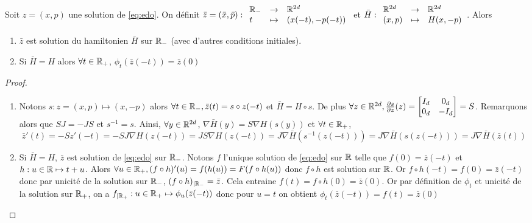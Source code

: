 \documentclass[10pt,a4paper]{article}
\begin{document}
\begin{Lem}\label{lem:sol-inverse}
  Soit $z = (x,p)$ une solution de \eqref{eq:edo}. On définit $\bar{z} = (\bar x, \bar p) : { \begin{array}{lcl} \mathbb{R}_{-} & \to & \mathbb{R}^{2d} \\ t & \mapsto & (x(-t), -p(-t)) \end{array} }$ et $\bar H : { \begin{array}{lcl} \mathbb{R}^{2d} & \to & \mathbb{R}^{2d} \\ (x,p) & \mapsto & H(x,-p) \end{array} }$. Alors

  \begin{enumerate}
  \item $\bar{z}$ est solution du hamiltonien $\bar H$ sur $\mathbb{R}_{-}$ (avec d'autres conditions initiales).
  \item Si $\bar{H} = H$ alors $\forall t \in \mathbb{R}_+$, $\phi_t(\bar{z}(-t)) = \bar{z}(0)$
  \end{enumerate}
  
\end{Lem}
\begin{proof}
\begin{enumerate}
\item   Notons $s : z = (x,p) \mapsto (x,-p)$ alors $\forall t \in \mathbb{R}_-, \bar{z}(t) = s \circ z (-t)$ et $\bar{H} = H \circ s$. De plus $\forall z \in \mathbb{R}^{2d}, \frac{\partial s}{\partial z}(z) = \begin{bmatrix} I_d & 0_d \\ 0_d & -I_d \end{bmatrix} = S$. Remarquons alors que $S J = - J S$ et $s^{-1} = s$. Ainsi, $\forall y \in \mathbb{R}^{2d}$, $\nabla \bar{H} (y) = S \nabla H (s(y))$ et $\forall t \in \mathbb{R}_+$,
  $$
  \bar{z}'(t) = - S z'(-t) = - S J \nabla H (z(-t)) = J S \nabla H(z(-t)) =  J \nabla \bar{H} (s^{-1}(z(-t))) = J \nabla \bar{H} (s(z(-t))) = J \nabla \bar{H} (\bar{z}(t))
  $$
\item Si $\bar{H} = H$, $\bar{z}$ est solution de \eqref{eq:edo} sur $\mathbb{R}_-$. Notons $f$ l'unique solution de \eqref{eq:edo} sur $\mathbb{R}$ telle que $f(0) = \bar{z}(-t)$ et $h : u \in \mathbb{R} \mapsto t + u$. Alors $\forall u \in \mathbb{R}_+, (f\circ h)'(u) = f(h(u)) = F(f\circ h (u))$ donc $f\circ h$ est solution sur $\mathbb{R}$. Or $f\circ h (-t) = f(0) = \bar{z}(-t)$ donc par unicité de la solution sur $\mathbb{R}_-$, $(f \circ h)_{| \mathbb{R}_-} = \bar{z}$. Cela entraine $f(t) = f \circ h (0) = \bar{z}(0)$. Or par définition de $\phi_t$ et unicité de la solution sur $\mathbb{R}_+$, on a $f_{|\mathbb{R}_+} : u \in \mathbb{R}_+ \mapsto \phi_u(\bar{z}(-t))$ donc pour $u = t$ on obtient $\phi_t(\bar{z}(-t)) = f(t) = \bar{z}(0)$
\end{enumerate}  

\end{proof}
\end{document}
